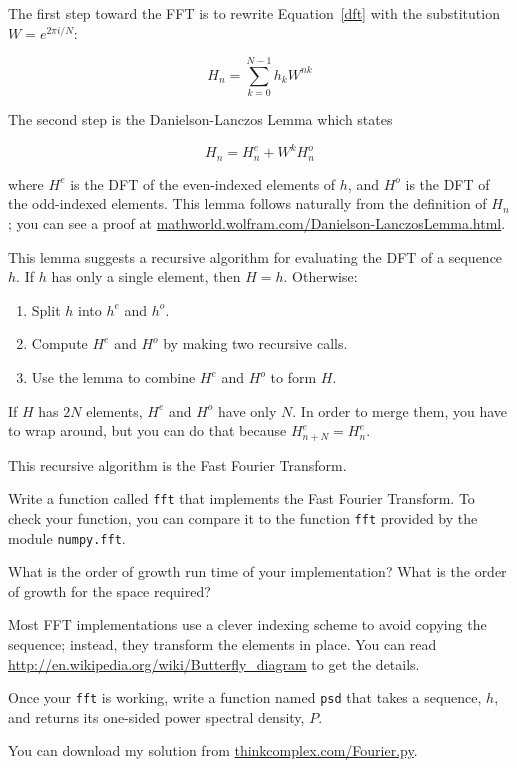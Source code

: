 \documentclass[10pt]{book}
\begin{document}
The first step toward the FFT is to rewrite Equation~\ref{dft}
with the substitution $W = e^{2 \pi i/N}$:

\begin{equation}
H_n = \sum_{k=0}^{N-1} h_k W^{n k}
\end{equation}

The second step is the Danielson-Lanczos Lemma which states

\[ H_n = H^e_n + W^k H^o_n \]

where $H^e$ is the DFT of the even-indexed elements
of $h$, and $H^o$ is the DFT of the odd-indexed elements.
This lemma follows naturally from the definition of $H_n$; you can see
a proof at \url{mathworld.wolfram.com/Danielson-LanczosLemma.html}.

This lemma suggests a recursive algorithm for evaluating the DFT
of a sequence $h$.  If  $h$ has only a single element, then $H=h$.
Otherwise:

\begin{enumerate}

\item Split $h$ into $h^e$ and $h^o$.

\item Compute $H^e$ and $H^o$ by making two recursive calls.

\item Use the lemma to combine $H^e$ and $H^o$ to form $H$.

\end{enumerate}

If $H$ has $2N$ elements, $H^e$ and $H^o$ have only $N$.
In order to merge them, you have to wrap around, but you
can do that because $H^e_{n+N} = H^e_{n}$.

This recursive algorithm is the Fast Fourier Transform.

\begin{exercise}

Write a function called {\tt fft} that implements
the Fast Fourier Transform.  To check your function, you
can compare it to the function {\tt fft} provided by
the module {\tt numpy.fft}.

What is the order of growth run time of your implementation?
What is the order of growth for the space required?

Most FFT implementations use a clever indexing scheme to avoid copying
the sequence; instead, they transform the elements in place.  You can
read \url{http://en.wikipedia.org/wiki/Butterfly_diagram} to get the details.

Once your {\tt fft} is working, write a function named
{\tt psd} that takes a sequence, $h$, and returns its
one-sided power spectral density, $P$.

You can download my solution from \url{thinkcomplex.com/Fourier.py}.

\end{exercise}
\end{document}
